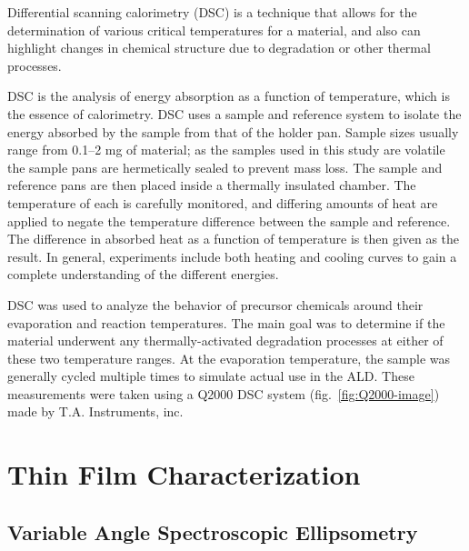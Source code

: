 Differential scanning calorimetry (DSC) is a technique that allows for the determination of various critical temperatures for a material, and also can highlight changes in chemical structure due to degradation or other thermal processes. 

DSC is the analysis of energy absorption as a function of temperature, which is the essence of calorimetry. DSC uses a sample and reference system to isolate the energy absorbed by the sample from that of the holder pan. Sample sizes usually range from 0.1--2 mg of material; as the samples used in this study are volatile the sample pans are hermetically sealed to prevent mass loss. The sample and reference pans are then placed inside a thermally insulated chamber. The temperature of each is carefully monitored, and differing amounts of heat are applied to negate the temperature difference between the sample and reference. The difference in absorbed heat as a function of temperature is then given as the result. In general, experiments include both heating and cooling curves to gain a complete understanding of the different energies.\cite{oneill_DSC_1964,skoog_DSC_1998,wunderlich_thermal_1990} 
	
DSC was used to analyze the behavior of precursor chemicals around their evaporation and reaction temperatures. The main goal was to determine if the material underwent any thermally-activated degradation processes at either of these two temperature ranges. At the evaporation temperature, the sample was generally cycled multiple times to simulate actual use in the ALD. These measurements were taken using a Q2000 DSC system (fig.~\vref{fig:Q2000-image}) made by T.A. Instruments, inc.	


\section{Thin Film Characterization}
\label{sec:Charact-ThinFilm}


	
\subsection{Variable Angle Spectroscopic Ellipsometry}

